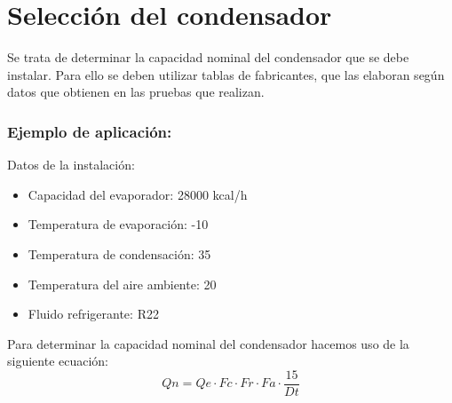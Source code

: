 \section{Selección del condensador}

Se trata de determinar la capacidad nominal del condensador que se debe instalar. Para ello se deben utilizar tablas de fabricantes, que las elaboran seg\'un datos que obtienen en las pruebas que realizan.

\subsubsection{Ejemplo de aplicaci\'on:}

Datos de la instalaci\'on:
\begin{itemize}
    \item Capacidad del evaporador: 28000 kcal/h
    \item Temperatura de evaporaci\'on: -10\textcelsius
    \item Temperatura de condensaci\'on: 35\textcelsius
    \item Temperatura del aire ambiente: 20\textcelsius
    \item Fluido refrigerante: R22
\end{itemize}
Para determinar la capacidad nominal del condensador hacemos uso de la siguiente ecuaci\'on:
\begin{equation}
    Qn = Qe \cdot Fc \cdot Fr \cdot Fa \cdot \frac{15}{Dt}
\end{equation}

